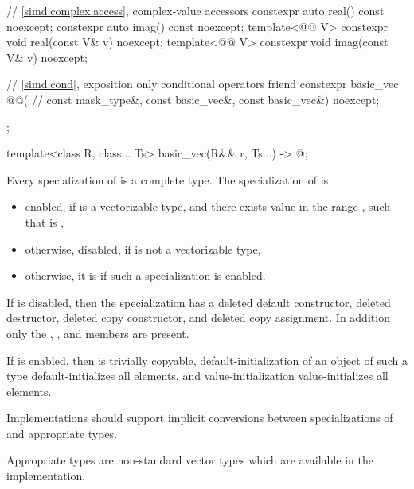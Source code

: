 \begin{codeblock}
{{    // \ref{simd.complex.access},  complex-value accessors
    constexpr auto real() const noexcept;
    constexpr auto imag() const noexcept;
    template<@@ V>
      constexpr void real(const V& v) noexcept;
    template<@@ V>
      constexpr void imag(const V& v) noexcept;

    // \ref{simd.cond},  exposition only conditional operators
    friend constexpr basic_vec @@( // \expos
      const mask_type&, const basic_vec&, const basic_vec&) noexcept;
  };

  template<class R, class... Ts>
    basic_vec(R&& r, Ts...) -> @\seebelow@;
}
\end{codeblock}

\pnum
Every specialization of  is a complete type.
The specialization of  is
\begin{itemize}
 \item
    enabled, if  is a vectorizable type, and there exists value
     in the range , such that  is
    ,
 \item
   otherwise, disabled, if  is not a vectorizable type,
 \item
   otherwise, it is  if such a specialization is enabled.
\end{itemize}

If  is disabled, then the specialization has a
deleted default constructor, deleted destructor, deleted copy constructor, and
deleted copy assignment.
In addition only the , , and
 members are present.

If  is enabled, then  is
trivially copyable, default-initialization of an object of such a type
default-initializes all elements, and value-initialization value-initializes
all elements.

\pnum
\recommended
Implementations should support implicit conversions between specializations of
 and appropriate  types.
\begin{note}
Appropriate types are non-standard vector types which are available in the
implementation.
\end{note}

